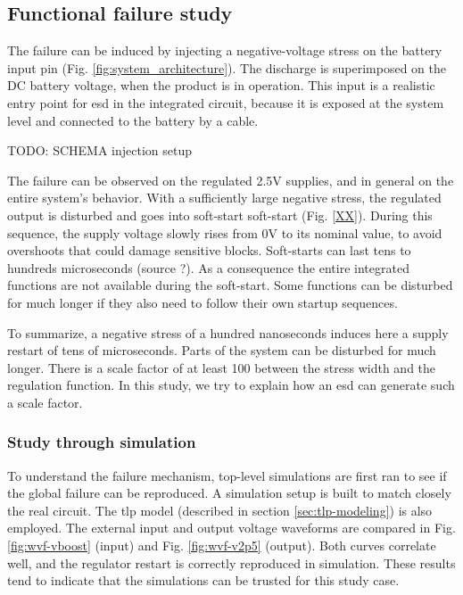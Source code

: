 \subsection{Functional failure study}
\label{sec:failure-case-study}

The failure can be induced by injecting a negative-voltage stress on the battery input pin (Fig. \ref{fig:system_architecture}).
The discharge is superimposed on the DC battery voltage, when the product is in operation.
This input is a realistic entry point for \gls{esd} in the integrated circuit, because it is exposed at the system level and connected to the battery by a cable.

TODO: SCHEMA injection setup


The failure can be observed on the regulated 2.5V supplies, and in general on the entire system's behavior.
With a sufficiently large negative stress, the regulated output is disturbed and goes into soft-start \gls{soft-start} (Fig. \ref{XX}).
During this sequence, the supply voltage slowly rises from 0V to its nominal value, to avoid overshoots that could damage sensitive blocks.
Soft-starts can last tens to hundreds microseconds (source ?).
As a consequence the entire integrated functions are not available during the soft-start.
Some functions can be disturbed for much longer if they also need to follow their own startup sequences.


To summarize, a negative stress of a hundred nanoseconds induces here a supply restart of tens of microseconds.
Parts of the system can be disturbed for much longer.
There is a scale factor of at least 100 between the stress width and the regulation function.
In this study, we try to explain how an \gls{esd} can generate such a scale factor.

\subsubsection{Study through simulation}

To understand the failure mechanism, top-level simulations are first ran to see if the global failure can be reproduced.
A simulation setup is built to match closely the real circuit.
The \gls{tlp} model (described in section \ref{sec:tlp-modeling}) is also employed.
The external input and output voltage waveforms are compared in Fig. \ref{fig:wvf-vboost} (input) and Fig. \ref{fig:wvf-v2p5} (output).
Both curves correlate well, and the regulator restart is correctly reproduced in simulation.
These results tend to indicate that the simulations can be trusted for this study case.

